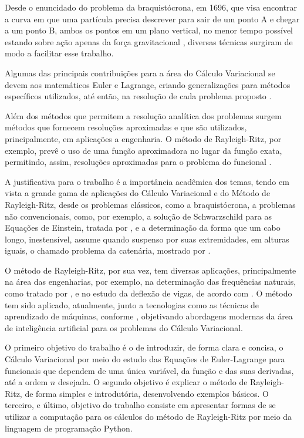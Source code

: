 \documentclass[
	12pt,				%
	openright,			%
    twoside,			%
	a4paper,			%
	english,			%
	french,				%
	spanish,			%
	brazil				%
	]{abntex2}
\numberwithin{lema}{chapter}
\numberwithin{teorema}{chapter}
\numberwithin{definicao}{chapter}
\numberwithin{exemplo}{chapter}
\numberwithin{figure}{chapter}
\begin{document}
Desde o enuncidado do problema da braquistócrona, em 1696, que visa encontrar a curva em que uma partícula precisa descrever para sair de um ponto A e chegar a um ponto B, ambos os pontos em um plano vertical, no menor tempo possível estando sobre ação apenas da força gravitacional \cite{calcvar}, diversas técnicas surgiram de modo a facilitar esse trabalho. 

Algumas das principais contribuições para a área do Cálculo Variacional se devem aos matemáticos Euler e Lagrange, criando generalizações para métodos específicos utilizados, até então, na resolução de cada problema proposto \cite{hist_courant}.

Além dos métodos que permitem a resolução analítica dos problemas surgem métodos que fornecem resoluções aproximadas e que são utilizados, principalmente, em aplicações a engenharia. O método de Rayleigh-Ritz, por exemplo, prevê o uso de uma função aproximadora no lugar da função exata, permitindo, assim, resoluções aproximadas para o problema do funcional \cite{mefassan}.

A justificativa para o trabalho é a importância acadêmica dos temas, tendo em vista a grande gama de aplicações do Cálculo Variacional e do Método de Rayleigh-Ritz, desde os problemas clássicos, como a braquistócrona, a problemas não convencionais, como, por exemplo, a solução de Schwarzschild para as Equações de Einstein, tratada por , e a determinação da forma que um cabo longo, inestensível, assume quando suspenso por suas extremidades, em alturas iguais, o chamado problema da catenária, mostrado por . 

O método de Rayleigh-Ritz, por sua vez, tem diversas aplicações, principalmente na área das engenharias, por exemplo, na determinação das frequências naturais, como tratado por , e no estudo da deflexão de vigas, de acordo com . O método tem sido aplicado, atualmente, junto a tecnologias como as técnicas de aprendizado de máquinas, conforme , objetivando abordagens modernas da área de inteligência artificial para os problemas do Cálculo Variacional. 

O primeiro objetivo do trabalho é o de introduzir, de forma clara e concisa, o Cálculo Variacional por meio do estudo das Equações de Euler-Lagrange para funcionais que dependem de uma única variável, da função e das suas derivadas, até a ordem $n$ desejada. O segundo objetivo é explicar o método de Rayleigh-Ritz, de forma simples e introdutória, desenvolvendo exemplos básicos. O terceiro, e último, objetivo do trabalho consiste em apresentar formas de se utilizar a computação para os cálculos do método de Rayleigh-Ritz por meio da linguagem de programação Python.
\end{document}
